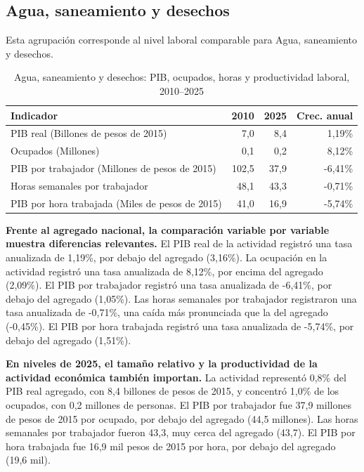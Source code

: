 \subsection{Agua, saneamiento y desechos}

Esta agrupación corresponde al nivel laboral comparable para Agua, saneamiento y desechos.

\begin{table}[H]
\centering
\caption{Agua, saneamiento y desechos: PIB, ocupados, horas y productividad laboral, 2010--2025}
\label{tab:agg25_e_productividad}
\small
\begin{tabular}{lrrr}
\toprule
Indicador & 2010 & 2025 & Crec. anual \\
\midrule
PIB real  (Billones de pesos de 2015) & 7,0 & 8,4 & 1,19\% \\
Ocupados (Millones) & 0,1 & 0,2 & 8,12\% \\
PIB por trabajador (Millones de pesos de 2015) & 102,5 & 37,9 & -6,41\% \\
Horas semanales por trabajador & 48,1 & 43,3 & -0,71\% \\
PIB por hora trabajada (Miles de pesos de 2015) & 41,0 & 16,9 & -5,74\% \\
\bottomrule
\end{tabular}
\end{table}

\textbf{Frente al agregado nacional, la comparación variable por variable muestra diferencias relevantes.} El PIB real de la actividad registró una tasa anualizada de 1,19\%, por debajo del agregado (3,16\%). La ocupación en la actividad registró una tasa anualizada de 8,12\%, por encima del agregado (2,09\%). El PIB por trabajador registró una tasa anualizada de -6,41\%, por debajo del agregado (1,05\%). Las horas semanales por trabajador registraron una tasa anualizada de -0,71\%, una caída más pronunciada que la del agregado (-0,45\%). El PIB por hora trabajada registró una tasa anualizada de -5,74\%, por debajo del agregado (1,51\%).

\textbf{En niveles de 2025, el tamaño relativo y la productividad de la actividad económica también importan.} La actividad representó 0,8\% del PIB real agregado, con 8,4 billones de pesos de 2015, y concentró 1,0\% de los ocupados, con 0,2 millones de personas. El PIB por trabajador fue 37,9 millones de pesos de 2015 por ocupado, por debajo del agregado (44,5 millones). Las horas semanales por trabajador fueron 43,3, muy cerca del agregado (43,7). El PIB por hora trabajada fue 16,9 mil pesos de 2015 por hora, por debajo del agregado (19,6 mil).

